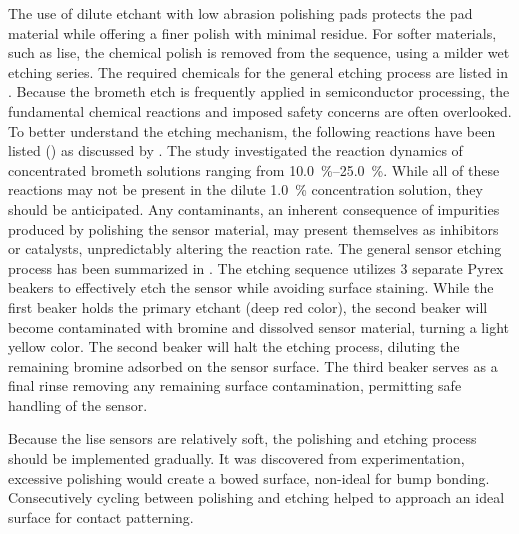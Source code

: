 \documentclass[../../main.tex]{subfiles}%
\begin{document}
    The use of dilute etchant with low abrasion polishing pads protects the pad material while offering a finer polish with minimal residue.
    For softer materials, such as \gls{lise}, the chemical polish is removed from the sequence, using a milder wet etching series.
    The required chemicals for the general etching process are listed in .
    Because the \gls{brometh} etch is frequently applied in semiconductor processing, the fundamental chemical reactions and imposed safety concerns are often overlooked.
    To better understand the etching mechanism, the following reactions have been listed () as discussed by \citeauthor*{Bowman_1990} \cite{Bowman_1990}.
    The study investigated the reaction dynamics of concentrated \gls{brometh} solutions ranging from \SIrange{10.0}{25.0}{\percent}. 
    While all of these reactions may not be present in the dilute \SI{1.0}{\percent} concentration solution, they should be anticipated.
    Any contaminants, an inherent consequence of impurities produced by polishing the sensor material, may present themselves as inhibitors or catalysts, unpredictably altering the reaction rate.
    The general sensor etching process has been summarized in .
    The etching sequence utilizes 3 separate Pyrex beakers to effectively etch the sensor while avoiding surface staining.
    While the first beaker holds the primary etchant (deep red color), the second beaker will become contaminated with bromine and dissolved sensor material, turning a light yellow color.
    The second beaker will halt the etching process, diluting the remaining bromine adsorbed on the sensor surface.
    The third beaker serves as a final rinse removing any remaining surface contamination, permitting safe handling of the sensor.
    \par%
    Because the \gls{lise} sensors are relatively soft, the polishing and etching process should be implemented gradually.
    It was discovered from experimentation, excessive polishing would create a bowed surface, non-ideal for bump bonding.
    Consecutively cycling between polishing and etching helped to approach an ideal surface for contact patterning.
\end{document}
